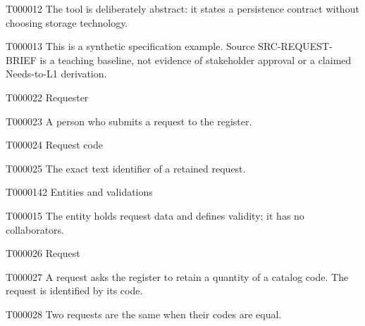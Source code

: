 \documentclass[11pt,a4paper]{article}
\begin{document}
\begin{atlasnote}{T000012}
The tool is deliberately abstract: it states a persistence contract without choosing storage technology.
\end{atlasnote}
\begin{atlasparagraph}{T000013}
This is a synthetic specification example. Source SRC-REQUEST-BRIEF is a teaching baseline, not evidence of stakeholder approval or a claimed Needs-to-L1 derivation.
\end{atlasparagraph}
\begin{atlastext}{T000022}
Requester
\end{atlastext}
\begin{atlasparagraph}{T000023}
A person who submits a request to the register.
\end{atlasparagraph}
\begin{atlastext}{T000024}
Request code
\end{atlastext}
\begin{atlasparagraph}{T000025}
The exact text identifier of a retained request.
\end{atlasparagraph}
\begin{atlasheading}{T000014}{2}
Entities and validations
\end{atlasheading}
\begin{atlasparagraph}{T000015}
The entity holds request data and defines validity; it has no collaborators.
\end{atlasparagraph}
\begin{atlastext}{T000026}
Request
\end{atlastext}
\begin{atlasparagraph}{T000027}
A request asks the register to retain a quantity of a catalog code. The request is identified by its code.
\end{atlasparagraph}
\begin{atlasparagraph}{T000028}
Two requests are the same when their codes are equal.
\end{atlasparagraph}
\end{document}
